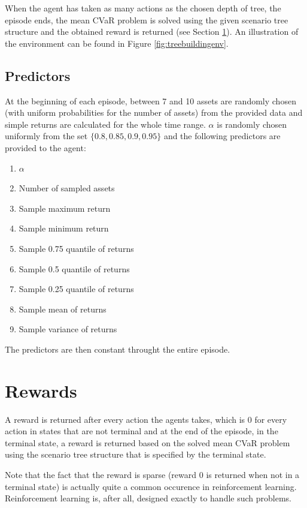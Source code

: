 When the agent has taken as many actions as the chosen depth of tree, the episode ends, the mean CVaR problem is solved using the given scenario tree structure and the obtained reward is returned (see Section \ref{section:rewards}). An illustration of the environment can be found in Figure \ref{fig:treebuildingenv}.

\subsection{Predictors}
\label{subsection:predictors}
At the beginning of each episode, between 7 and 10 assets are randomly chosen (with uniform probabilities for the number of assets) from the provided data and simple returns are calculated for the whole time range. $\alpha$ is randomly chosen uniformly from the set $\{0.8, 0.85, 0.9, 0.95\}$ and the following predictors are provided to the agent:
\begin{enumerate}
\item $\alpha$
\item Number of sampled assets
\item Sample maximum return
\item Sample minimum return
\item Sample 0.75 quantile of returns
\item Sample 0.5 quantile of returns
\item Sample 0.25 quantile of returns
\item Sample mean of returns
\item Sample variance of returns
\end{enumerate}
The predictors are then constant throught the entire episode.

\section{Rewards}
\label{section:rewards}
A reward is returned after every action the agents takes, which is 0 for every action in states that are not terminal and at the end of the episode, in the terminal state, a reward is returned based on the solved mean CVaR problem using the scenario tree structure that is specified by the terminal state. 
\begin{rem}
Note that the fact that the reward is sparse (reward 0 is returned when not in a terminal state) is actually quite a common occurence in reinforcement learning. Reinforcement learning is, after all, designed exactly to handle such problems.
\end{rem}


